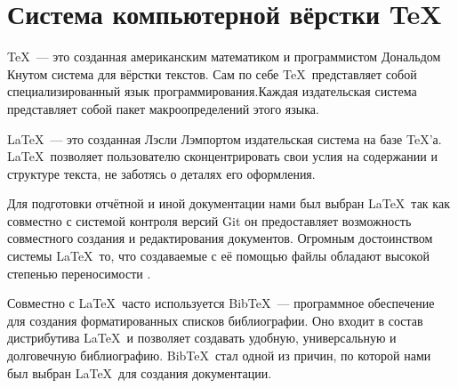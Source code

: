 \newpage

\section{Система компьютерной вёрстки \TeX}
\TeX\ --- это созданная американским математиком и программистом Дональдом Кнутом система для вёрстки текстов. Сам по себе \TeX\ представляет собой специализированный язык программирования.Каждая издательская система представляет собой пакет макроопределений этого языка.

\LaTeX\ --- это созданная Лэсли Лэмпортом издательская система на базе \TeX'а\cite{lvovskyi}. \LaTeX\ позволяет пользователю сконцентрировать свои услия на содержании и структуре текста, не заботясь о деталях его оформления.

Для подготовки отчётной и иной документации нами был выбран \LaTeX\, так как совместно с системой контроля версий Git он предоставляет возможность совместного создания и редактирования документов. Огромным достоинством системы \LaTeX\ то, что создаваемые с её помощью файлы обладают высокой степенью переносимости \cite{latexrus}.

Совместно с \LaTeX\ часто используется Bib\TeX\ --- программное обеспечение для создания форматированных списков библиографии. Оно входит в состав дистрибутива \LaTeX\ и позволяет создавать удобную, универсальную и долговечную библиографию. Bib\TeX\ стал одной из причин, по которой нами был выбран \LaTeX\ для создания документации.

